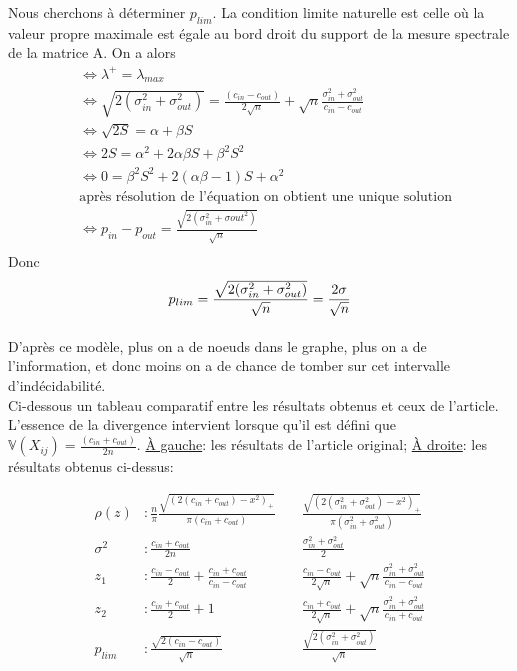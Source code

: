 Nous cherchons à déterminer $p_{lim}$.
La condition limite naturelle est celle où la valeur propre maximale est égale au bord droit du support de la mesure spectrale de la matrice A.
On a alors 
\begin{align*}
	&\Leftrightarrow \lambda^+ = \lambda_{max}\\
	&\Leftrightarrow \sqrt{2(\sigma_{in}^2 + \sigma_{out}^2)} = \frac{(c_{in} - c_{out})}{2\sqrt{n}} + \sqrt{n}\frac{\sigma_{in}^2 + \sigma_{out}^2}{c_{in} - c_{out}}\\
	&\Leftrightarrow \sqrt{2S} = \alpha + \beta S\\
	&\Leftrightarrow 2S = \alpha^2 + 2\alpha \beta S +\beta^2 S^2\\
	&\Leftrightarrow 0 = \beta^2 S^2 + 2(\alpha \beta - 1)S+ \alpha^2 \\
	&\text{après résolution de l'équation on obtient une unique solution}\\
	&\Leftrightarrow p_{in} - p_{out} = \frac{\sqrt{2(\sigma_{in}^2 + \sigma{out}^2)}}{\sqrt{n}}  \\
\end{align*}
Donc
\begin{equation}
	p_{lim} = \frac{\sqrt{2(\sigma_{in}^2 + \sigma_{out}^2)}}{\sqrt{n}}= \frac{2\sigma}{\sqrt{n}}  \\
\end{equation}

\paragraph{}\label{rq:ngrand}
D'après ce modèle, plus on a de noeuds dans le graphe, plus on a de l'information, et donc moins on a de chance de tomber sur cet intervalle d’indécidabilité.\\

Ci-dessous un tableau comparatif entre les résultats obtenus et ceux de l'article.
L'essence de la divergence intervient lorsque qu'il est défini que $\mathbb{V}(X_{ij}) = \frac{(c_{in} + c_{out})}{2n}$.
\underline{À gauche}: les résultats de l'article original; \underline{À droite}: les résultats obtenus ci-dessus:

\begin{align*}
	\rho (z)&: \frac{n}{\pi}\frac{\sqrt{(2(c_{in} + c_{out}) - x^2)_+}}{\pi(c_{in} + c_{out})} &\;& \frac{\sqrt{(2(\sigma_{in}^2 + \sigma_{out}^2) - x^2)_+}}{\pi(\sigma_{in}^2 + \sigma_{out}^2)}\\
	\sigma^2&: \frac{c_{in} + c_{out}}{2n} &\;& \frac{\sigma_{in}^2 + \sigma_{out}^2}{2} \\
	z_1&: \frac{c_{in}-c_{out}}{2} + \frac{c_{in}+c_{out}}{c_{in}-c_{out}} &\;& \frac{c_{in}-c_{out}}{2\sqrt{n}} + \sqrt{n}\frac{\sigma_{in}^2+\sigma_{out}^2}{c_{in}-c_{out}}\\
	z_2&: \frac{c_{in}+c_{out}}{2} + 1 &\;& \frac{c_{in}+c_{out}}{2\sqrt{n}} + \sqrt{n}\frac{\sigma_{in}^2+\sigma_{out}^2}{c_{in}+c_{out}}\\
	p_{lim}&: \frac{\sqrt{2(c_{in} - c_{out})}}{\sqrt{n}}&\;& \frac{\sqrt{2(\sigma_{in}^2 + \sigma_{out}^2)}}{\sqrt{n}}\\
\end{align*}



